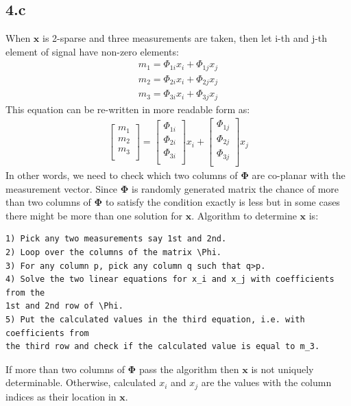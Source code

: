 \documentclass[12pt]{article}
\begin{document}
\subsection*{4.c}
When $\boldsymbol{x}$ is 2-sparse and three measurements are taken, then let i-th and j-th element of signal have non-zero elements:
\begin{align*}
    m_1 = \Phi_{1i}x_i+\Phi_{1j}x_j\\
    m_2 = \Phi_{2i}x_i+\Phi_{2j}x_j\\
    m_3 = \Phi_{3i}x_i+\Phi_{3j}x_j
\end{align*}
This equation can be re-written in more readable form as:
\begin{align*}
    \begin{bmatrix} 
    m_1 \\
    m_2 \\
    m_3 \\
    \end{bmatrix} =
    \begin{bmatrix} 
    \Phi_{1i} \\
    \Phi_{2i} \\
    \Phi_{3i} \\
    \end{bmatrix}x_i +
    \begin{bmatrix} 
    \Phi_{1j} \\
    \Phi_{2j} \\
    \Phi_{3j} \\
    \end{bmatrix}x_j
\end{align*}
In other words, we need to check which two columns of $\boldsymbol{\Phi}$ are co-planar with the measurement vector. Since $\boldsymbol{\Phi}$ is randomly generated matrix the chance of more than two columns of $\boldsymbol{\Phi}$ to satisfy the condition exactly is less but in some cases there might be more than one solution for $\boldsymbol{x}$. Algorithm to determine $\boldsymbol{x}$ is:
\begin{verbatim}
1) Pick any two measurements say 1st and 2nd.
2) Loop over the columns of the matrix \Phi.
3) For any column p, pick any column q such that q>p.
4) Solve the two linear equations for x_i and x_j with coefficients from the 
1st and 2nd row of \Phi.
5) Put the calculated values in the third equation, i.e. with coefficients from 
the third row and check if the calculated value is equal to m_3.
\end{verbatim}
If more than two columns of $\boldsymbol{\Phi}$ pass the algorithm then $\boldsymbol{x}$ is not uniquely determinable. Otherwise, calculated $x_i$ and $x_j$ are the values with the column indices as their location in $\boldsymbol{x}$.
\end{document}
